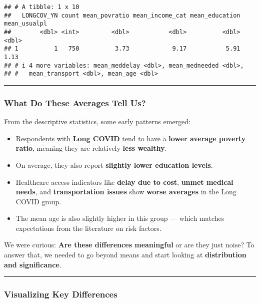 \documentclass[
]{article}
\providecommand{\tightlist}{%
  \setlength{\itemsep}{0pt}\setlength{\parskip}{0pt}}
\begin{document}
\begin{verbatim}
## # A tibble: 1 x 10
##   LONGCOV_YN count mean_povratio mean_income_cat mean_education mean_usualpl
##        <dbl> <int>         <dbl>           <dbl>          <dbl>        <dbl>
## 1          1   750          3.73            9.17           5.91         1.13
## # i 4 more variables: mean_meddelay <dbl>, mean_medneeded <dbl>,
## #   mean_transport <dbl>, mean_age <dbl>
\end{verbatim}

\begin{center}\rule{0.5\linewidth}{0.5pt}\end{center}

\subsubsection{What Do These Averages Tell
Us?}\label{what-do-these-averages-tell-us}

From the descriptive statistics, some early patterns emerged:

\begin{itemize}
\tightlist
\item
  Respondents with \textbf{Long COVID} tend to have a \textbf{lower
  average poverty ratio}, meaning they are relatively \textbf{less
  wealthy}.
\item
  On average, they also report \textbf{slightly lower education levels}.
\item
  Healthcare access indicators like \textbf{delay due to cost},
  \textbf{unmet medical needs}, and \textbf{transportation issues} show
  \textbf{worse averages} in the Long COVID group.
\item
  The mean age is also slightly higher in this group --- which matches
  expectations from the literature on risk factors.
\end{itemize}

We were curious: \textbf{Are these differences meaningful} or are they
just noise? To answer that, we needed to go beyond means and start
looking at \textbf{distribution and significance}.

\begin{center}\rule{0.5\linewidth}{0.5pt}\end{center}

\subsubsection{Visualizing Key
Differences}\label{visualizing-key-differences}
\end{document}
